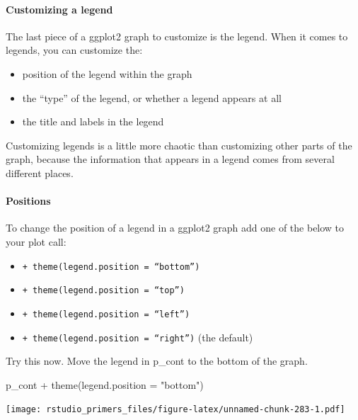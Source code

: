 \documentclass[
]{article}
\newenvironment{Shaded}{\begin{snugshade}}{\end{snugshade}}
\newcommand{\AttributeTok}[1]{\textcolor[rgb]{0.77,0.63,0.00}{#1}}
\newcommand{\FunctionTok}[1]{\textcolor[rgb]{0.00,0.00,0.00}{#1}}
\newcommand{\NormalTok}[1]{#1}
\newcommand{\SpecialCharTok}[1]{\textcolor[rgb]{0.00,0.00,0.00}{#1}}
\newcommand{\StringTok}[1]{\textcolor[rgb]{0.31,0.60,0.02}{#1}}
\providecommand{\tightlist}{%
  \setlength{\itemsep}{0pt}\setlength{\parskip}{0pt}}
\begin{document}
\hypertarget{customizing-a-legend}{%
\paragraph{Customizing a legend}\label{customizing-a-legend}}

The last piece of a ggplot2 graph to customize is the legend. When it
comes to legends, you can customize the:

\begin{itemize}
\tightlist
\item
  position of the legend within the graph
\item
  the ``type'' of the legend, or whether a legend appears at all
\item
  the title and labels in the legend
\end{itemize}

Customizing legends is a little more chaotic than customizing other
parts of the graph, because the information that appears in a legend
comes from several different places.

\hypertarget{positions-1}{%
\paragraph{Positions}\label{positions-1}}

To change the position of a legend in a ggplot2 graph add one of the
below to your plot call:

\begin{itemize}
\tightlist
\item
  \texttt{+\ theme(legend.position\ =\ “bottom”)}
\item
  \texttt{+\ theme(legend.position\ =\ “top”)}
\item
  \texttt{+\ theme(legend.position\ =\ “left”)}
\item
  \texttt{+\ theme(legend.position\ =\ “right”)} (the default)
\end{itemize}

Try this now. Move the legend in p\_cont to the bottom of the graph.

\begin{Shaded}
\begin{Highlighting}[]
\NormalTok{p\_cont }\SpecialCharTok{+} \FunctionTok{theme}\NormalTok{(}\AttributeTok{legend.position =} \StringTok{"bottom"}\NormalTok{)}
\end{Highlighting}
\end{Shaded}

\texttt{[image: rstudio\_primers\_files/figure-latex/unnamed-chunk-283-1.pdf]}
\end{document}
